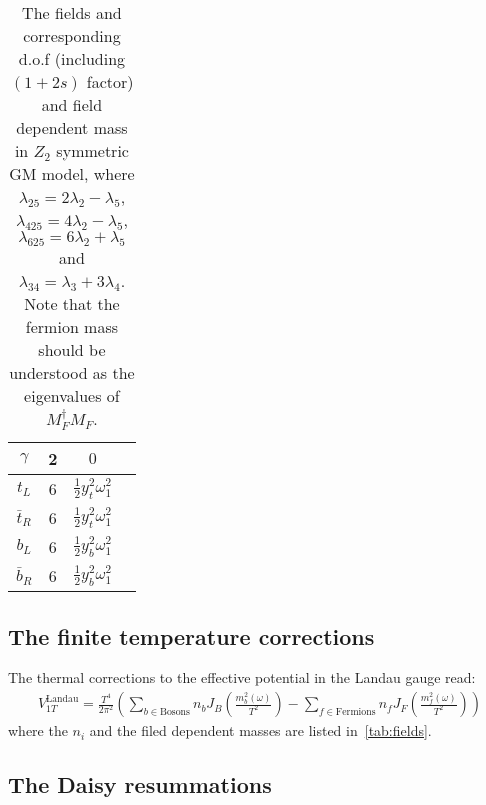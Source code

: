 \documentclass[12pt]{article}
\begin{document}
\begin{table}
{\begin{tabular}{|c|c|c|c|}
        $\gamma$ & 2 & $0$ \\
        \hline
        $t_L$ & 6 & $\frac{1}{2}y_t^2\omega_1^2$ \\
        \hline
        $\bar{t}_R$ & 6 & $\frac{1}{2}y_t^2\omega_1^2$ \\
        \hline
        $b_L$ & 6 & $\frac{1}{2}y_b^2\omega_1^2$ \\
        \hline
        $\bar{b}_R$ & 6 & $\frac{1}{2}y_b^2\omega_1^2$ \\
        \hline
    \end{tabular}}
    \caption{\label{tab:fields}The fields and corresponding d.o.f (including $(1+2s)$ factor) and field dependent mass in $Z_2$ symmetric GM model, where $\lambda_{25}=2\lambda_2 -\lambda_5$, $\lambda_{425}=4\lambda_2-\lambda_5$, $\lambda_{625}=6\lambda_2+\lambda_5$ and $\lambda_{34}=\lambda_3+3\lambda_4$. Note that the fermion mass should be understood as the eigenvalues of $M_F^\dagger M_F$.}
\end{table}

\subsection{The finite temperature corrections}

The thermal corrections to the effective potential in the Landau gauge read:
\begin{align}
    V_{1T}^{\text{Landau}} = \frac{T^4}{2\pi^2}\left(\sum_{b\in\text{Bosons}}n_b J_B\left(\frac{m_b^2(\omega)}{T^2}\right)-\sum_{f\in\text{Fermions}}n_fJ_F\left(\frac{m_f^2(\omega)}{T^2}\right)\right)
\end{align}
where the $n_i$ and the filed dependent masses are listed in~\autoref{tab:fields}.

\subsection{The Daisy resummations}




\end{document}
